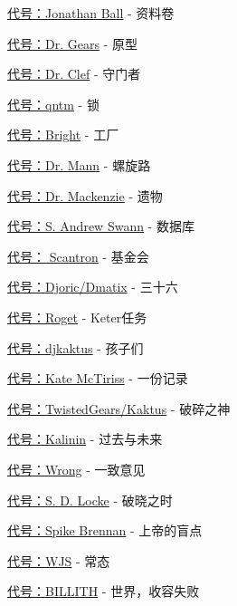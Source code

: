 
\hr

\begin{scpboxbrc}

\hyperref[chap:SCP-001.sheaf.of.papers]{代号：Jonathan Ball} - 资料卷

\hyperref[chap:SCP-001.the.prototype]{代号：Dr. Gears} - 原型

\hyperref[chap:SCP-001.the.gate.guardian]{代号：Dr. Clef} - 守门者

\hyperref[chap:SCP-001.the.lock]{代号：qntm} - 锁

\hyperref[chap:SCP-001.the.factory]{代号：Bright} - 工厂

\hyperref[chap:SCP-001.the.spiral.path]{代号：Dr. Mann} - 螺旋路

\hyperref[chap:SCP-001.the.legacy]{代号：Dr. Mackenzie} - 遗物

\hyperref[chap:SCP-001.the.database]{代号：S. Andrew Swann} - 数据库

\hyperref[chap:SCP-001.the.foundation]{代号： Scantron} - 基金会

\hyperref[chap:SCP-001.thirty.six]{代号：Djoric/Dmatix} - 三十六

\hyperref[chap:SCP-001.keter.duty]{代号：Roget} - Keter任务

\hyperref[chap:SCP-001.the.children]{代号：djkaktus} - 孩子们

\hyperref[chap:SCP-001.a.record]{代号：Kate McTiriss} - 一份记录

\hyperref[chap:SCP-001.the.broken.god]{代号：TwistedGears/Kaktus} - 破碎之神

\hyperref[chap:SCP-001.past.and.future]{代号：Kalinin} - 过去与未来

\hyperref[chap:SCP-001.the.consensus]{代号：Wrong} - 一致意见

\hyperref[chap:SCP-001.when.day.breaks]{代号：S. D. Locke} - 破晓之时

\hyperref[chap:SCP-001.gods.blind.spot]{代号：Spike Brennan} - 上帝的盲点

\hyperref[chap:SCP-001.normalcy]{代号：WJS} - 常态

\hyperref[chap:SCP-001.the.world.at.large]{代号：BILLITH} - 世界，收容失败


\end{scpboxbrc}
